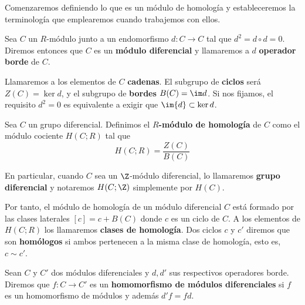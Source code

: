 Comenzaremos definiendo lo que es un módulo de homología y estableceremos la terminología
que emplearemos cuando trabajemos con ellos.

\begin{definicion}
	Sea \(C\) un \(R\)-módulo junto a un endomorfismo \(d: C \rightarrow C\) tal que \(d^{2}
	= d \circ d = 0\). Diremos entonces que \(C\) es un \textbf{módulo diferencial} y
	llamaremos a \(d\) \textbf{operador borde} de \(C\).
\end{definicion}

Llamaremos a los elementos de \(C\) \textbf{cadenas}. El subgrupo de \textbf{ciclos}
será \(Z(C) = \ker d\), y el subgrupo de \textbf{bordes} \(B(C) = \im d\). Si nos
fijamos, el requisito \(d^{2} = 0\) es equivalente a exigir que \(\im{d}\subset \ker
{d}\).

\begin{definicion}
	Sea \(C\) un grupo diferencial. Definimos el \textbf{\(R\)-módulo de homología} de
	\(C\) como el módulo cociente \(H(C;R)\) tal que
	\[
	H(C;R) = \frac{Z(C)}{B(C)}
	\]
\end{definicion}

En particular, cuando \(C\) sea un \(\Z\)-módulo diferencial, lo llamaremos \textbf{grupo
	diferencial} y notaremos \(H(C;\Z)\) simplemente por \(H(C)\).

Por tanto, el módulo de homología de un módulo diferencial \(C\) está formado por
las clases laterales \([c] = c + B(C)\) donde \(c\) es un ciclo de \(C\). A los elementos
de \(H(C;R)\) los llamaremos \textbf{clases de homología}. Dos ciclos \(c\) y \(c'\) diremos
que son \textbf{homólogos} si ambos pertenecen a la misma clase de homología, esto
es, \(c \sim c'\).

\begin{definicion}
	Sean \(C\) y \(C'\) dos módulos diferenciales y \(d, d'\) sus respectivos operadores
	borde. Diremos que \(f: C \rightarrow C'\) es un \textbf{homomorfismo de módulos
		diferenciales} si \(f\) es un homomorfismo de módulos y además \(d'f = fd\).
\end{definicion}


